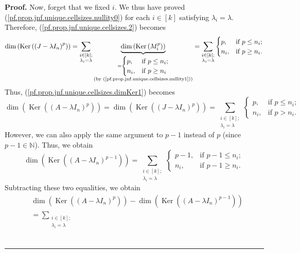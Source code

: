 \documentclass[numbers=enddot,12pt,final,onecolumn,notitlepage]{scrartcl}%
\numberwithin{exer}{subsection}
\theoremstyle{definition}
\newenvironment{proof}[1][Proof]{\noindent\textbf{#1.} }{\ \rule{0.5em}{0.5em}}
\let\sumnonlimits\sum
\renewcommand{\sum}{\sumnonlimits\limits}
\begin{document}
\begin{proof}
Now, forget that we fixed $i$. We thus have proved
(\ref{pf.prop.jnf.unique.cellsizes.nullity0}) for each $i\in\left[  k\right]
$ satisfying $\lambda_{i}=\lambda$. Therefore,
(\ref{pf.prop.jnf.unique.cellsizes.2}) becomes%
\[
\dim\left(  \operatorname*{Ker}\left(  \left(  J-\lambda I_{n}\right)
^{p}\right)  \right)  =\sum_{\substack{i\in\left[  k\right]  ;\\\lambda
_{i}=\lambda}}\underbrace{\dim\left(  \operatorname*{Ker}\left(  M_{i}%
^{p}\right)  \right)  }_{\substack{=%
\begin{cases}
p, & \text{if }p\leq n_{i};\\
n_{i}, & \text{if }p\geq n_{i}%
\end{cases}
\\\text{(by (\ref{pf.prop.jnf.unique.cellsizes.nullity1}))}}}=\sum
_{\substack{i\in\left[  k\right]  ;\\\lambda_{i}=\lambda}}%
\begin{cases}
p, & \text{if }p\leq n_{i};\\
n_{i}, & \text{if }p\geq n_{i}.
\end{cases}
\]
Thus, (\ref{pf.prop.jnf.unique.cellsizes.dimKer1}) becomes%
\[
\dim\left(  \operatorname*{Ker}\left(  \left(  A-\lambda I_{n}\right)
^{p}\right)  \right)  =\dim\left(  \operatorname*{Ker}\left(  \left(
J-\lambda I_{n}\right)  ^{p}\right)  \right)  =\sum_{\substack{i\in\left[
k\right]  ;\\\lambda_{i}=\lambda}}%
\begin{cases}
p, & \text{if }p\leq n_{i};\\
n_{i}, & \text{if }p>n_{i}.
\end{cases}
\]
However, we can also apply the same argument to $p-1$ instead of $p$ (since
$p-1\in\mathbb{N}$). Thus, we obtain%
\[
\dim\left(  \operatorname*{Ker}\left(  \left(  A-\lambda I_{n}\right)
^{p-1}\right)  \right)  =\sum_{\substack{i\in\left[  k\right]  ;\\\lambda
_{i}=\lambda}}%
\begin{cases}
p-1, & \text{if }p-1\leq n_{i};\\
n_{i}, & \text{if }p-1\geq n_{i}.
\end{cases}
\]
Subtracting these two equalities, we obtain%
\begin{align*}
&  \dim\left(  \operatorname*{Ker}\left(  \left(  A-\lambda I_{n}\right)
^{p}\right)  \right)  -\dim\left(  \operatorname*{Ker}\left(  \left(
A-\lambda I_{n}\right)  ^{p-1}\right)  \right) \\
&  =\sum_{\substack{i\in\left[  k\right]  ;\\\lambda_{i}=\lambda}}%

\end{align*}
\end{proof}
\end{document}
